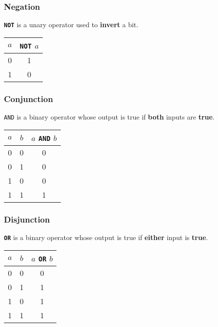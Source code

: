 \documentclass{article}
\newcommand{\keywordinline}[1]{\textcolor[rgb]{0.00,0.50,0.00}{\textbf{\texttt{#1}}}}
\begin{document}
\subsubsection{Negation}
\keywordinline{NOT} is a unary operator used to \textbf{invert} a bit.
\begin{table}[H]
    \centering
    \begin{tabular}{c c}
        \toprule
        \textbf{\(a\)} & \keywordinline{NOT} \(a\) \\
        \midrule
        0              & 1                         \\
        1              & 0                         \\
        \bottomrule
    \end{tabular}
\end{table}
\subsubsection{Conjunction}
\texttt{AND} is a binary operator whose output is true if \textbf{both} inputs are \textbf{true}.
\begin{table}[H]
    \centering
    \begin{tabular}{c c c}
        \toprule
        \textbf{\(a\)} & \textbf{\(b\)} & \textbf{\(a\) \texttt{AND} \(b\)} \\
        \midrule
        0              & 0              & 0                                           \\
        0              & 1              & 0                                           \\
        1              & 0              & 0                                           \\
        1              & 1              & 1                                           \\
        \bottomrule
    \end{tabular}
\end{table}
\subsubsection{Disjunction}
\keywordinline{OR} is a binary operator whose output is true if \textbf{either} input is \textbf{true}.
\begin{table}[H]
    \centering
    \begin{tabular}{c c c}
        \toprule
        \textbf{\(a\)} & \textbf{\(b\)} & \(a\) \keywordinline{OR} \(b\) \\
        \midrule
        0              & 0              & 0                              \\
        0              & 1              & 1                              \\
        1              & 0              & 1                              \\
        1              & 1              & 1                              \\
        \bottomrule
    \end{tabular}
\end{table}
\end{document}
